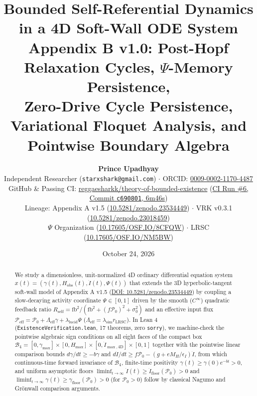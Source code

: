 \documentclass[11pt,a4paper]{article}
\title{\textbf{Bounded Self-Referential Dynamics in a 4D Soft-Wall ODE System}\\[6pt]
\large Appendix B v1.0: Post-Hopf Relaxation Cycles, $\Psi$-Memory Persistence,\\
Zero-Drive Cycle Persistence, Variational Floquet Analysis, and Pointwise Boundary Algebra}
\author{\textbf{Prince Upadhyay}\\
\small Independent Researcher (\texttt{starxshark@gmail.com}) $\cdot$ ORCID: \href{https://orcid.org/0009-0002-1170-4487}{0009-0002-1170-4487}\\[2pt]
\small GitHub \& Passing CI: \href{https://github.com/reggaesharkk/theory-of-bounded-existence}{reggaesharkk/theory-of-bounded-existence} (\href{https://github.com/reggaesharkk/theory-of-bounded-existence/commit/c690801}{CI Run \#6, Commit \texttt{c690801}, 6m46s})\\[1pt]
\small Lineage: Appendix A v1.5 (\href{https://doi.org/10.5281/zenodo.23534449}{10.5281/zenodo.23534449}) $\cdot$ VRK v0.3.1 (\href{https://doi.org/10.5281/zenodo.23018459}{10.5281/zenodo.23018459})\\[1pt]
\small $\Psi$ Organization (\href{https://doi.org/10.17605/OSF.IO/8CFQW}{10.17605/OSF.IO/8CFQW}) $\cdot$ LRSC (\href{https://doi.org/10.17605/OSF.IO/NM5BW}{10.17605/OSF.IO/NM5BW})}
\date{October 24, 2026}
\theoremstyle{definition}
\begin{document}
\maketitle
\thispagestyle{fancy}

\begin{abstract}
We study a dimensionless, unit-normalized 4D ordinary differential equation system $x(t) = (\gamma(t), H_{\mathrm{obs}}(t), \dot{I}(t), \Psi(t))$ that extends the 3D hyperbolic-tangent soft-wall model of Appendix A v1.5 (\href{https://doi.org/10.5281/zenodo.23534449}{DOI: 10.5281/zenodo.23534449}) by coupling a slow-decaying activity coordinate $\Psi \in [0, 1]$ driven by the smooth ($C^\infty$) quadratic feedback ratio $R_{\mathrm{self}} = \mathrm{fb}^2 / (\mathrm{fb}^2 + (f\mathcal{P}_0)^2 + \sigma_0^2)$ and an effective input flux $\mathcal{P}_{\mathrm{eff}} = \mathcal{P}_0 + \Lambda_{\mathrm{eff}}\gamma + \lambda_{\mathrm{lucid}}\Psi$ ($\Lambda_{\mathrm{eff}} = \lambda_{\mathrm{sim}}r_{\mathrm{LRSC}}$). In Lean 4 (\texttt{ExistenceVerification.lean}, 17 theorems, zero \texttt{sorry}), we machine-check the pointwise algebraic sign conditions on all eight faces of the compact box $\mathcal{B}_4 = [0, \gamma_{\max}] \times [0, H_{\max}] \times [0, \dot{I}_{\max,4\mathrm{D}}] \times [0, 1]$ together with the pointwise linear comparison bounds $d\gamma/dt \ge -b\gamma$ and $d\dot{I}/dt \ge f\mathcal{P}_0 - (g + e M_H/\epsilon_I)\dot{I}$, from which continuous-time forward invariance of $\mathcal{B}_4$, finite-time positivity $\gamma(t) \ge \gamma(0)e^{-bt} > 0$, and uniform asymptotic floors $\liminf_{t\to\infty}\dot{I}(t) \ge \dot{I}_{\mathrm{floor}}(\mathcal{P}_0) > 0$ and $\liminf_{t\to\infty}\gamma(t) \ge \gamma_{\mathrm{floor}}(\mathcal{P}_0) > 0$ (for $\mathcal{P}_0 > 0$) follow by classical Nagumo and Gr\"onwall comparison arguments.


\end{abstract}
\end{document}
